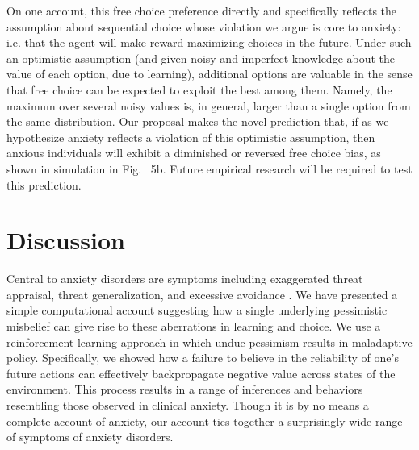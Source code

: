 \documentclass[11pt]{article} %
\begin{document}
On one account\citep{ly2019}, this free choice preference directly and specifically reflects the assumption about sequential choice whose violation we argue is core to anxiety: i.e. that the agent will make reward-maximizing choices in the future. Under such an optimistic assumption (and given noisy and imperfect knowledge about the value of each option, due to learning), additional options are valuable in the sense that free choice can be expected to exploit the best among them. Namely, the maximum over several noisy values is, in general, larger than a single option from the same distribution. Our proposal makes the novel prediction that, if as we hypothesize anxiety reflects a violation of this optimistic assumption, then anxious individuals will exhibit a diminished or reversed free choice bias, as shown in simulation in Fig. ~5b. Future empirical research will be required to test this prediction.

\section{Discussion}

Central to anxiety disorders are symptoms including exaggerated threat appraisal, threat generalization, and excessive avoidance \citep{ClarkBeck2011, dymond2015, Arnaudova2017}. We have presented a simple computational account suggesting how a single underlying pessimistic misbelief can give rise to these aberrations in learning and choice. We use a reinforcement learning approach in which undue pessimism results in maladaptive policy. Specifically, we showed how a failure to believe in the reliability of one's future actions can effectively backpropagate negative value across states of the environment. This process results in a range of inferences and behaviors resembling those observed in clinical anxiety. Though it is by no means a complete account of anxiety, our account ties together a surprisingly wide range of symptoms of anxiety disorders.
\end{document}
